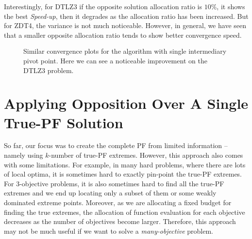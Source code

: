 \documentclass{sig-alternate-05-2015}
\begin{document}
Interestingly, for DTLZ3 if the opposite solution allocation ratio is \(10\%\), it shows the best \textit{Speed-up}, then it degrades as the allocation ratio has been increased. But for ZDT4, the variance is not much noticeable. However, in general, we have seen that a smaller opposite allocation ratio tends to show better convergence speed.\vfill \eject

%
\begin{figure*}[!htp]
	\centering
	\hfill
	\caption{Similar convergence plots for the algorithm with single intermediary pivot point. Here we can see a noticeable improvement on the DTLZ3 problem.}
	\label{plot:single-pf}
\end{figure*}
%
%
%
\section{Applying Opposition Over A Single True-PF Solution}
\label{sec:single-pf}
So far, our focus was to create the complete PF from limited information -- namely using \(k\)-number of true-PF extremes. However, this approach also comes with some limitations. For example, in many hard problems, where there are lots of local optima, it is sometimes hard to exactly pin-point the true-PF extremes. For 3-objective problems, it is also sometimes hard to find all the true-PF extremes and we end up locating only a subset of them or some weakly dominated extreme points. Moreover, as we are allocating a fixed budget for finding the true extremes, the allocation of function evaluation for each objective decreases as the number of objectives become larger. Therefore, this approach may not be much useful if we want to solve a \textit{many-objective} problem.
\end{document}
